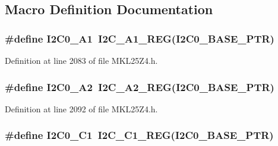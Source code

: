 \subsection{Macro Definition Documentation}
\subsubsection[{\texorpdfstring{I2\+C0\+\_\+\+A1}{I2C0_A1}}]{\setlength{\rightskip}{0pt plus 5cm}\#define I2\+C0\+\_\+\+A1~{\bf I2\+C\+\_\+\+A1\+\_\+\+R\+EG}({\bf I2\+C0\+\_\+\+B\+A\+S\+E\+\_\+\+P\+TR})}\hypertarget{group___i2_c___register___accessor___macros_gaab25b2cfc0f440c11ba84defee435e0e}{}\label{group___i2_c___register___accessor___macros_gaab25b2cfc0f440c11ba84defee435e0e}


Definition at line 2083 of file M\+K\+L25\+Z4.\+h.

\subsubsection[{\texorpdfstring{I2\+C0\+\_\+\+A2}{I2C0_A2}}]{\setlength{\rightskip}{0pt plus 5cm}\#define I2\+C0\+\_\+\+A2~{\bf I2\+C\+\_\+\+A2\+\_\+\+R\+EG}({\bf I2\+C0\+\_\+\+B\+A\+S\+E\+\_\+\+P\+TR})}\hypertarget{group___i2_c___register___accessor___macros_ga99708d179cf5e948315ac4ff5d8d0983}{}\label{group___i2_c___register___accessor___macros_ga99708d179cf5e948315ac4ff5d8d0983}


Definition at line 2092 of file M\+K\+L25\+Z4.\+h.

\subsubsection[{\texorpdfstring{I2\+C0\+\_\+\+C1}{I2C0_C1}}]{\setlength{\rightskip}{0pt plus 5cm}\#define I2\+C0\+\_\+\+C1~{\bf I2\+C\+\_\+\+C1\+\_\+\+R\+EG}({\bf I2\+C0\+\_\+\+B\+A\+S\+E\+\_\+\+P\+TR})}\hypertarget{group___i2_c___register___accessor___macros_gad710afb8dd19706b83bc65c3f460e81d}{}\label{group___i2_c___register___accessor___macros_gad710afb8dd19706b83bc65c3f460e81d}


